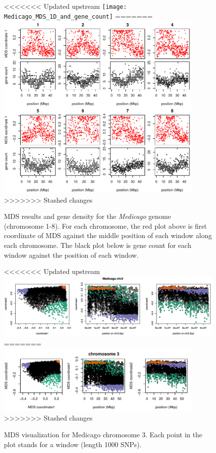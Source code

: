 \documentclass[11pt, oneside]{article}   	%
\begin{document}
\begin{figure}
    \begin{center}
<<<<<<< Updated upstream
       \texttt{[image: Medicago\_MDS\_1D\_and\_gene\_count]}
=======
       \includegraphics[width=0.9\textwidth]{Fig5_MDS_and_gene_count_allchr}
>>>>>>> Stashed changes
    \end{center}
    \caption{
         MDS results and gene density for the \textit{Medicago} genome (chromosome 1-8). 
         For each chromosome, the red plot above is first coordinate of MDS against the middle position of each window along each chromosome. 
         The black plot below is gene count for each window against the position of each window.
         \label{fig:mds_medicago}
    }
\end{figure}

\begin{figure}
    \begin{center}
<<<<<<< Updated upstream
       \includegraphics{medicago_mds}
=======
       \includegraphics[width=0.9\textwidth]{Fig6_Together_MDS_plot_chr3_final}
>>>>>>> Stashed changes
    \end{center}
    \caption{
     MDS visualization for Medicago chromosome 3. Each point in the plot stands for a window (length 1000 SNPs).
       \label{fig:mds12_medicago}
    }
\end{figure}
\end{document}

